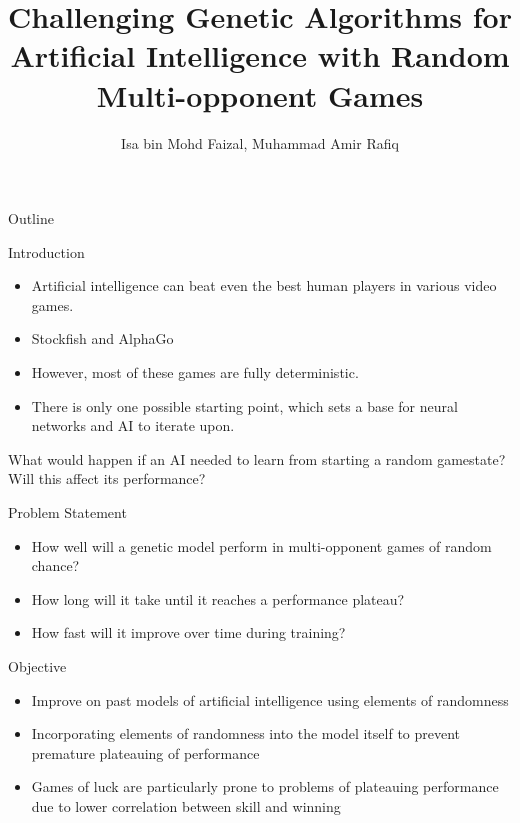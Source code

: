 \documentclass{beamer}
\title{Challenging Genetic Algorithms for Artificial Intelligence with Random Multi-opponent Games}
\author{Isa bin Mohd Faizal, Muhammad Amir Rafiq}
\institute{Universiti Kebangsaan Malaysia}
\begin{document}
	
\begin{frame}[plain]
    \maketitle
\end{frame}

\begin{frame}{Outline}

	\tableofcontents
	
\end{frame}

\begin{frame}{Introduction}
	
	\begin{itemize}
		\item  Artificial intelligence can beat even the best human players in various video games.
		\item Stockfish and AlphaGo
		\item However, most of these games are fully deterministic.
		\item There is only one possible starting point, which sets a base for neural networks and AI to iterate upon.
	\end{itemize}
	What would happen if an AI needed to learn from starting a random gamestate? Will this affect its performance?
	
\end{frame}

\begin{frame}{Problem Statement}

	\begin{itemize}
		
		\item How well will a genetic model perform in multi-opponent games of random chance?
		\item How long will it take until it reaches a performance plateau?
		\item How fast will it improve over time during training?
		
		
	\end{itemize}

\end{frame}

\begin{frame}{Objective}
	
	\begin{itemize}
		
		\item Improve on past models of artificial intelligence using elements of randomness
		\item Incorporating elements of randomness into the model itself to prevent premature plateauing of performance
		\item Games of luck are particularly prone to problems of plateauing performance due to lower correlation between skill and winning

	\end{itemize}
	
\end{frame}
\end{document}
